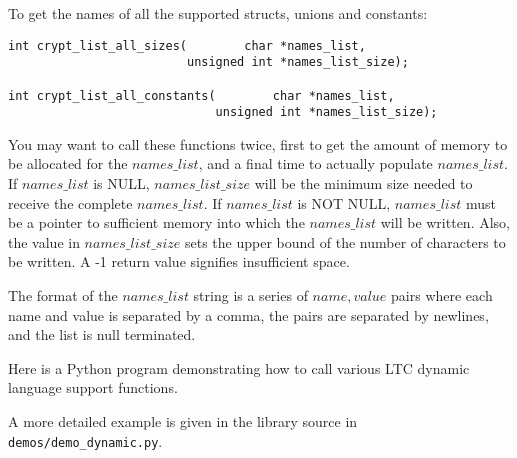 \documentclass[synpaper]{book}
\begin{document}
To get the names of all the supported structs, unions and constants:
\begin{verbatim}
int crypt_list_all_sizes(        char *names_list,
                         unsigned int *names_list_size);

int crypt_list_all_constants(        char *names_list,
                             unsigned int *names_list_size);
\end{verbatim}
You may want to call these functions twice, first to get the amount
of memory to be allocated for the $names\_list$, and a final time to
actually populate $names\_list$.  If $names\_list$ is NULL,
$names\_list\_size$ will be the minimum size needed to receive the
complete $names\_list$.  If $names\_list$ is NOT NULL, $names\_list$ must
be a pointer to sufficient memory into which the $names\_list$ will be
written.  Also, the value in $names\_list\_size$ sets the upper bound of
the number of characters to be written.  A -1 return value signifies
insufficient space.

The format of the $names\_list$ string is a series of $name,value$ pairs
where each name and value is separated by a comma, the pairs are separated
by newlines, and the list is null terminated.

Here is a Python program demonstrating how to call various LTC dynamic
language support functions.

A more detailed example is given in the library source in \texttt{demos/demo\_dynamic.py}.
\end{document}
